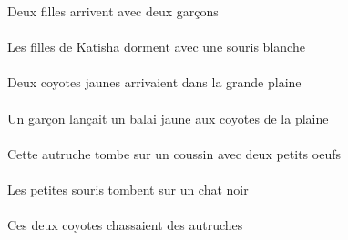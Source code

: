 \begin{exe}
Deux filles arrivent avec deux garçons
\ex\gll
\DEFPlAbs{}    \INDSgObl{}   \KatishaASgObl{}   \DE{}   \filleCPlAbs{}    \INDSgObl{}   \blancBSg{}   \sourisBSgObl{}   \AVEC{}  \dormirViPrsCPl{}\\
\DEFPlAbsP{}    \INDSgOblP{}   \KatishaASgOblP{}   \DEP{}   \filleCPlAbsP{}    \INDSgOblP{}   \blancBSgP{}   \sourisBSgOblP{}   \AVECP{}  \dormirViPrsCPlP{}\\
Les filles de Katisha dorment avec une souris blanche
\ex\gll
\INDDuAbs{}   \jauneCDu{}   \coyoteCDuAbs{}    \DEFSgObl{}   \grandASg{}   \plaineASgObl{}   \DANS{}  \arriverViPstCDu{}\\
\INDDuAbsP{}   \jauneCDuP{}   \coyoteCDuAbsP{}    \DEFSgOblP{}   \grandASgP{}   \plaineASgOblP{}   \DANSP{}  \arriverViPstCDuP{}\\
Deux coyotes jaunes arrivaient dans la grande plaine
\ex\gll
\INDSgErg{}   \garconDSgErg{}    \DEFPlDat{}    \DEFSgObl{}   \plaineASgObl{}   \DE{}   \coyoteCPlDat{}   \INDSgAbs{}   \jauneASg{}   \balaiASgAbs{}  \lancerVdPstASg{}\\
\INDSgErgP{}   \garconDSgErgP{}    \DEFPlDatP{}    \DEFSgOblP{}   \plaineASgOblP{}   \DEP{}   \coyoteCPlDatP{}   \INDSgAbsP{}   \jauneASgP{}   \balaiASgAbsP{}  \lancerVdPstASgP{}\\
Un garçon lançait un balai jaune aux coyotes de la plaine
\ex\gll
\INDDuObl{}   \petitCDu{}   \oeufCDuObl{}   \AVEC{}   \DEMSgAbs{}   \autrucheBSgAbs{}    \INDSgObl{}   \coussinBSgObl{}   \SUR{}  \tomberViPrsBSg{}\\
\INDDuOblP{}   \petitCDuP{}   \oeufCDuOblP{}   \AVECP{}   \DEMSgAbsP{}   \autrucheBSgAbsP{}    \INDSgOblP{}   \coussinBSgOblP{}   \SURP{}  \tomberViPrsBSgP{}\\
Cette autruche tombe sur un coussin avec deux petits oeufs
\ex\gll
\DEFPlAbs{}   \petitBPl{}   \sourisBPlAbs{}    \INDSgObl{}   \noirDSg{}   \chatDSgObl{}   \SUR{}  \tomberViPrsBPl{}\\
\DEFPlAbsP{}   \petitBPlP{}   \sourisBPlAbsP{}    \INDSgOblP{}   \noirDSgP{}   \chatDSgOblP{}   \SURP{}  \tomberViPrsBPlP{}\\
Les petites souris tombent sur un chat noir
\ex\gll
\DEMDuErg{}   \coyoteCDuErg{}   \INDPlAbs{}   \autrucheBPlAbs{}  \chasserVtPstBPl{}\\
\DEMDuErgP{}   \coyoteCDuErgP{}   \INDPlAbsP{}   \autrucheBPlAbsP{}  \chasserVtPstBPlP{}\\
Ces deux coyotes chassaient des autruches
\ex\gll
\DEFPlErg{}   \coyoteCPlErg{}    \DEMPlDat{}   \chatDPlDat{}   \INDSgAbs{}   \sourisBSgAbs{}  \lancerVdPstBSg{}\\

\end{exe}
